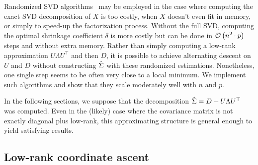 Randomized SVD algorithms~\citep{random_svd} may be employed
in the case where computing the exact SVD decomposition of $X$ is too costly,
when $X$ doesn't even fit in memory,
or simply to speed-up the factorization process.
Without the full SVD, computing the optimal shrinkage coefficient $\delta$ is more costly
but can be done in $\mathcal{O}\left( n^2 \cdot p \right)$ steps and without extra memory.
Rather than simply computing a low-rank approximation $U \Lambda U^\top$ and then $D$,
it is possible to achieve alternating descent on $U$ and $D$ without constructing $\hat{\Sigma}$ with these randomized
estimations.
Nonetheless, one single step seems to be often very close to a local minimum.
We implement such algorithms and show that they scale moderately well with $n$ and $p$.

\bigbreak
In the following sections,
we suppose that the decomposition $\hat{\Sigma} = D + U \Lambda U^\top$
was computed.
Even in the (likely) case where the covariance matrix is not exactly diagonal plus low-rank,
this approximating structure is general enough to yield satisfying results.

\subsection{Low-rank coordinate ascent}\label{subsec:low_rank_sdp}

